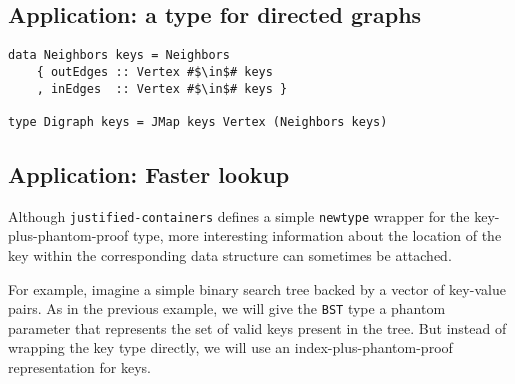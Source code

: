 \documentclass[format=sigplan, review=false, screen=true]{acmart}
\begin{document}
\begin{figure*}
  \begin{minipage}{0.48\textwidth}
    \inputminted{haskell}{justified.hs}
  \end{minipage}
  \begin{minipage}{0.48\textwidth}
    \inputminted{haskell}{justified-usage.hs}
  \end{minipage}
\end{figure*}

\subsection{Application: a type for directed graphs}

\begin{verbatim}
data Neighbors keys = Neighbors
    { outEdges :: Vertex #$\in$# keys
    , inEdges  :: Vertex #$\in$# keys }
  
type Digraph keys = JMap keys Vertex (Neighbors keys)
\end{verbatim}





\subsection{Application: Faster lookup}
Although \texttt{justified-containers} defines a simple \texttt{newtype} wrapper for
the key-plus-phantom-proof type, more interesting information about the location of
the key within the corresponding data structure can sometimes be attached.

For example, imagine a simple binary search tree backed by a vector of key-value pairs.
As in the previous example, we will give the \texttt{BST} type a phantom parameter that
represents the set of valid keys present in the tree. But instead of wrapping the key
type directly, we will use an index-plus-phantom-proof representation for keys.
\end{document}

